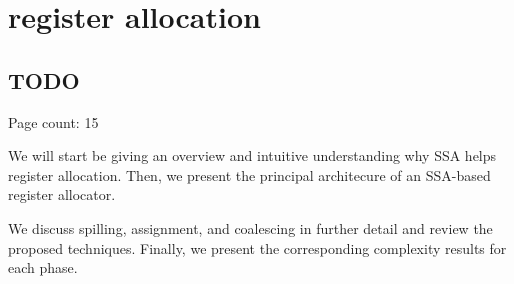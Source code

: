 \chapter{register allocation }
\section{TODO}


Page count: 15

We will start be giving an overview and intuitive understanding why SSA helps register allocation.
Then, we present the principal architecure of an SSA-based register allocator.

We discuss spilling, assignment, and coalescing in further detail and review the proposed techniques.
Finally, we present the corresponding complexity results for each phase.


